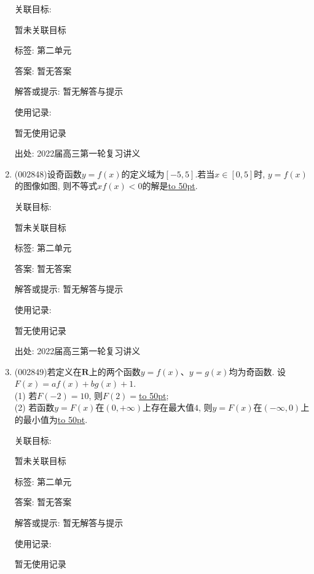 \documentclass[10pt,a4paper]{article}
\newcommand{\blank}[1]{\underline{\hbox to #1pt{}}}
\begin{document}
\begin{enumerate}[1.]
关联目标:

暂未关联目标



标签: 第二单元

答案: 暂无答案

解答或提示: 暂无解答与提示

使用记录:

暂无使用记录


出处: 2022届高三第一轮复习讲义
\item { (002848)}设奇函数$y=f(x)$的定义域为$[-5, 5]$.若当$x\in [0,5]$时, $y=f(x)$的图像如图, 则不等式$xf(x)<0$的解是\blank{50}.
\begin{center}
\end{center}


关联目标:

暂未关联目标



标签: 第二单元

答案: 暂无答案

解答或提示: 暂无解答与提示

使用记录:

暂无使用记录


出处: 2022届高三第一轮复习讲义
\item { (002849)}若定义在$\mathbf{R}$上的两个函数$y=f(x)$、$y=g(x)$均为奇函数. 设$F(x)=af(x)+bg(x)+1$.\\
(1) 若$F(-2)=10$, 则$F(2)=$\blank{50};\\
(2) 若函数$y=F(x)$在$(0,+\infty)$上存在最大值$4$, 则$y=F(x)$在$(-\infty ,0)$上的最小值为\blank{50}.


关联目标:

暂未关联目标



标签: 第二单元

答案: 暂无答案

解答或提示: 暂无解答与提示

使用记录:

暂无使用记录



\end{enumerate}
\end{document}
